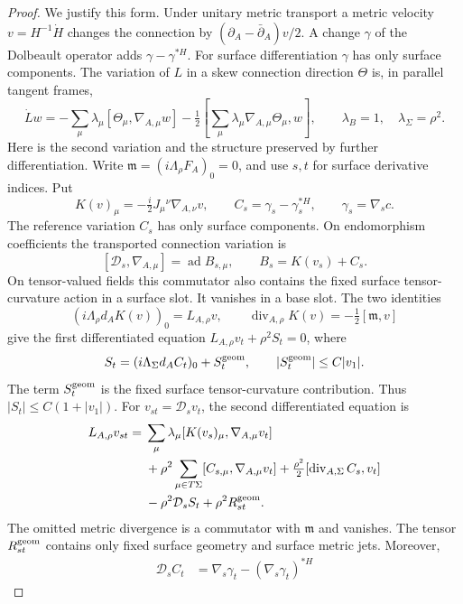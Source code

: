 \documentclass[11pt]{amsart}
\theoremstyle{definition}
\theoremstyle{remark}
\theoremstyle{plain}
\begin{document}
\begin{proof}
We justify this form. Under unitary metric transport a metric
velocity $v=H^{-1}\dot H$ changes the connection by
$(\partial_A-\bar\partial_A)v/2$. A change $\gamma$ of the
Dolbeault operator adds $\gamma-\gamma^{*H}$. For surface
differentiation $\gamma$ has only surface components. The
variation of $L$ in a skew connection direction $\Theta$ is,
in parallel tangent frames,
\[
 \dot Lw=-\sum_\mu\lambda_\mu[\Theta_\mu,\nabla_{A,\mu}w]
       -\tfrac12[\sum_\mu\lambda_\mu\nabla_{A,\mu}\Theta_\mu,w],
             \qquad \lambda_B=1,\quad\lambda_\Sigma=\rho^2.
\]
Here is the second variation and the structure preserved by
further differentiation. Write
$\mathfrak m=(i\Lambda_\rho F_A)_0=0$, and use $s,t$ for
surface derivative indices. Put
\[
 K(v)_\mu=-\tfrac i2J_\mu{}^\nu\nabla_{A,\nu}v,\qquad
 C_s=\gamma_s-\gamma_s^{*H},\qquad \gamma_s=\nabla_s c.
\]
The reference variation $C_s$ has only surface components.
On endomorphism coefficients the transported connection variation is
\[
 [\mathcal D_s,\nabla_{A,\mu}]
       =\operatorname{ad}B_{s,\mu},\qquad
 B_s=K(v_s)+C_s.
\]
On tensor-valued fields this commutator also contains the
fixed surface tensor-curvature action in a surface slot.
It vanishes in a base slot.
The two identities
\[
 (i\Lambda_\rho d_AK(v))_0=L_{A,\rho}v,\qquad
 \operatorname{div}_{A,\rho}K(v)=-\tfrac12[\mathfrak m,v]
\]
give the first differentiated equation
$L_{A,\rho}v_t+\rho^2S_t=0$, where
\[
 S_t=(i\Lambda_\Sigma d_AC_t)_0+S_t^{\rm geom},
 \qquad |S_t^{\rm geom}|\leq C|v_1|.
\]
The term $S_t^{\rm geom}$ is the fixed surface
tensor-curvature contribution. Thus
$|S_t|\leq C(1+|v_1|)$. For $v_{st}=\mathcal D_sv_t$,
the second differentiated equation is
\begin{equation}\label{eq:converse-second-metric-variation}
\begin{split}
 L_{A,\rho}v_{st}
 ={}&\sum_\mu\lambda_\mu
        [K(v_s)_\mu,\nabla_{A,\mu}v_t]\\
 &+\rho^2\sum_{\mu\in T\Sigma}
        [C_{s,\mu},\nabla_{A,\mu}v_t]
   +\tfrac{\rho^2}{2}
        [\operatorname{div}_{A,\Sigma}C_s,v_t]\\
 &-\rho^2\mathcal D_sS_t+\rho^2R^{\rm geom}_{st}.
\end{split}
\end{equation}
The omitted metric divergence is a commutator with
$\mathfrak m$ and vanishes. The tensor $R^{\rm geom}_{st}$
contains only fixed surface geometry and surface metric jets.
Moreover,
\[
\begin{split}
 \mathcal D_sC_t
   &=\nabla_s\gamma_t-(\nabla_s\gamma_t)^{*H}

\end{split}\]
\end{proof}
\end{document}
